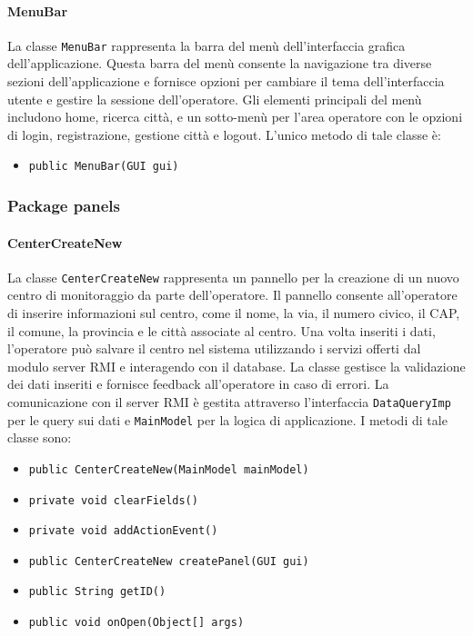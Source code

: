 \paragraph{MenuBar}

La classe \texttt{MenuBar} rappresenta la barra del menù dell'interfaccia grafica dell'applicazione.
Questa barra del menù consente la navigazione tra diverse sezioni dell'applicazione e fornisce opzioni per cambiare il tema dell'interfaccia utente e gestire la sessione dell'operatore.
Gli elementi principali del menù includono home, ricerca città, e un sotto-menù per l'area operatore con le opzioni di login, registrazione, gestione città e logout.
L'unico metodo di tale classe è:
\begin{itemize}
    \item \texttt{public MenuBar(GUI gui)}
\end{itemize}

\subsubsection {Package panels}

\paragraph{CenterCreateNew}

La classe \texttt{CenterCreateNew} rappresenta un pannello per la creazione di un nuovo centro di monitoraggio da parte dell'operatore.
Il pannello consente all'operatore di inserire informazioni sul centro, come il nome, la via, il numero civico, il CAP, il comune, la provincia e le città associate al centro. 
Una volta inseriti i dati, l'operatore può salvare il centro nel sistema utilizzando i servizi offerti dal modulo server RMI e interagendo con il database.
La classe gestisce la validazione dei dati inseriti e fornisce feedback all'operatore in caso di errori. 
La comunicazione con il server RMI è gestita attraverso l'interfaccia \texttt{DataQueryImp} per le query sui dati e \texttt{MainModel} per la logica di applicazione.
I metodi di tale classe sono:
\begin{itemize}
    \item \texttt{public CenterCreateNew(MainModel mainModel)}
    \item \texttt{private void clearFields()}
    \item \texttt{private void addActionEvent()}
    \item \texttt{public CenterCreateNew createPanel(GUI gui)}
    \item \texttt{public String getID()}
    \item \texttt{public void onOpen(Object[] args)}
\end{itemize}

